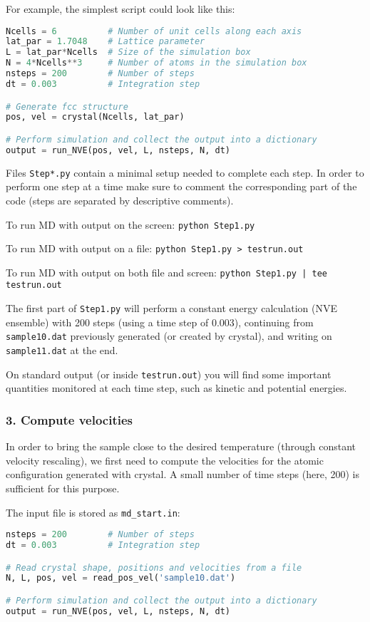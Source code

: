 \documentclass[12pt]{article}
\begin{document}
For example, the simplest script could look like this:

\begin{lstlisting}[language=python]
Ncells = 6          # Number of unit cells along each axis
lat_par = 1.7048    # Lattice parameter
L = lat_par*Ncells  # Size of the simulation box
N = 4*Ncells**3     # Number of atoms in the simulation box
nsteps = 200        # Number of steps
dt = 0.003          # Integration step

# Generate fcc structure
pos, vel = crystal(Ncells, lat_par)

# Perform simulation and collect the output into a dictionary
output = run_NVE(pos, vel, L, nsteps, N, dt)
\end{lstlisting}

Files \verb!Step*.py! contain a minimal setup needed to complete each step. In
order to perform one step at a time make sure to comment the corresponding
part of the code (steps are separated by descriptive comments).

To run MD with output on the screen:
	\verb!python Step1.py!

To run MD with output on a file:
	\verb!python Step1.py > testrun.out!

To run MD with output on both file and screen:
	\verb!python Step1.py | tee testrun.out !


The first part of \verb!Step1.py! will perform a constant energy calculation
(NVE ensemble) with 200 steps (using a time step of 0.003), continuing from
\verb!sample10.dat!  previously generated (or created by crystal), and writing
on \verb!sample11.dat!  at the end.

On standard output (or inside \verb!testrun.out!) you will find 
some important quantities monitored at each time step,
such as kinetic and potential energies. 

\subsubsection*{3. Compute velocities}

In order to bring the sample close to the desired temperature (through
constant velocity rescaling), we first need to compute the velocities 
for the atomic configuration generated with crystal. A small number of 
time steps (here, 200) is sufficient for this purpose.

The input file is stored as \verb!md_start.in!:

\begin{lstlisting}[language=python]
nsteps = 200        # Number of steps
dt = 0.003          # Integration step

# Read crystal shape, positions and velocities from a file
N, L, pos, vel = read_pos_vel('sample10.dat')

# Perform simulation and collect the output into a dictionary
output = run_NVE(pos, vel, L, nsteps, N, dt)
\end{lstlisting}
\end{document}

